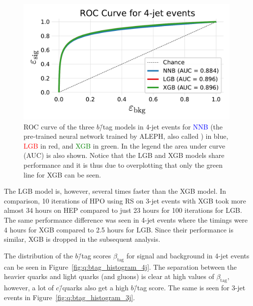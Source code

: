 \begin{figure}[h!]
  \vspace{-0.1cm}
  \centerfloat
  \includegraphics[width=0.99\textwidth, trim=10 10 10 40, clip]{figures/quarks/ROC_4_jet-down_sample=1.00-ML_vars=vertex-selection=b-ejet_min=4-n_iter_RS_lgb=99-n_iter_RS_xgb=9-cdot_cut=0.90-version=19.pdf}
  \caption[ROC Curve for 4-Jet $b$\=/Tagging]
          {ROC curve of the three $b$\=/tag models in 4-jet events for \textcolor{blue}{NNB} (the pre-trained neural network trained by ALEPH, also called ) in blue, \textcolor{red}{LGB} in red, and \textcolor{green}{XGB} in green. In the legend the area under curve (AUC) is also shown. Notice that the LGB and XGB models share performance and it is thus due to overplotting that only the green line for XGB can be seen. 
          } 
  \label{fig:q:roc_btag_4j}
\end{figure}
\vspace{-0.3cm}

The LGB model is, however, several times faster than the XGB model. In comparison, \num{10} iterations of HPO using RS on 3-jet events with XGB took more almost \num{34} hours on HEP compared to just \num{23} hours for \num{100} iterations for LGB. The same performance difference was seen in 4-jet events where the timings were \num{4} hours for XGB compared to \num{2.5} hours for LGB. Since their performance is similar, XGB is dropped in the subsequent analysis. 

The distribution of the $b$\=/tag scores $\beta_\mathrm{tag}$ for signal and background in 4-jet events can be seen in Figure~\ref{fig:q:btag_histogram_4j}. The separation between the heavier quarks and light quarks (and gluons) is clear at high values of $\beta_\mathrm{tag}$, however, a lot of $c$\=/quarks also get a high $b$\=/tag score. The same is seen for 3-jet events in Figure~\ref{fig:q:btag_histogram_3j}. 

